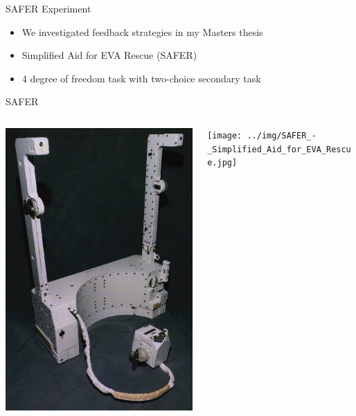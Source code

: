 \documentclass[10pt]{beamer}
\begin{document}
\begin{frame}[fragile]{SAFER Experiment}
\begin{itemize}
\item We investigated feedback strategies in my Masters thesis
\item Simplified Aid for EVA Rescue (SAFER)
\item 4 degree of freedom task with two-choice secondary task
\end{itemize}
\end{frame}

\begin{frame}[fragile]{SAFER}
  \begin{columns}[T]
    \begin{column}{.5\textwidth}
      \hfill
      \includegraphics[height=1.3\textwidth]{../img/SAFER_-_Simplified_Aid_for_EVA_Rescue_2.jpg}
    \end{column}%
    \begin{column}{.5\textwidth}
      \texttt{[image: ../img/SAFER\_-\_Simplified\_Aid\_for\_EVA\_Rescue.jpg]}
    \end{column}
  \end{columns}
\end{frame}
\end{document}
